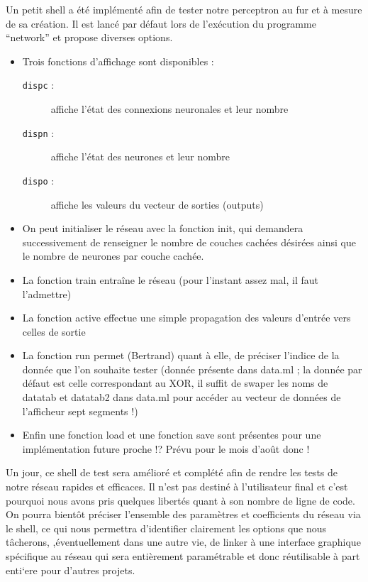 Un petit shell a \'et\'e impl\'ement\'e afin de tester notre perceptron
au fur et \`a mesure de sa cr\'eation. Il est lanc\'e par d\'efaut lors
de l'ex\'ecution du programme ``network'' et propose diverses
options. 
\begin{itemize}
	\item Trois fonctions d'affichage sont disponibles : 
\begin{description}
	\item[\verb!dispc! :] affiche l'\'etat des connexions neuronales et leur nombre
	\item[\verb!dispn! :] affiche l'\'etat des neurones et leur nombre
	\item[\verb!dispo! :] affiche les valeurs du vecteur de sorties (outputs)
\end{description}

\item On peut initialiser le r\'eseau avec la fonction init, qui demandera
successivement de renseigner le nombre de couches cach\'ees d\'esir\'ees
ainsi que le nombre de neurones par couche cach\'ee.

\item La fonction train entra\^ine le r\'eseau (pour l'instant assez mal, il
faut l'admettre) 

\item La fonction active effectue une simple propagation des valeurs
d'entr\'ee vers celles de sortie

\item La fonction run permet (Bertrand) quant \`a elle, de pr\'eciser l'indice de la donn\'ee
que l'on souhaite tester (donn\'ee pr\'esente dans data.ml ; la donn\'ee
par d\'efaut est celle correspondant au XOR, il suffit de swaper les
noms de datatab et datatab2 dans data.ml pour acc\'eder au vecteur de
donn\'ees de l'afficheur sept segments !)

\item Enfin une fonction load et une fonction save sont pr\'esentes pour une
impl\'ementation future proche !? Prévu pour le mois d'août donc !

\end{itemize}


Un jour, ce shell de test sera am\'elior\'e et compl\'et\'e afin de rendre les
tests de notre r\'eseau rapides et efficaces. Il n'est pas destin\'e \`a
l'utilisateur final et c'est pourquoi nous avons pris quelques
libert\'es quant \`a son nombre de ligne de code.
On pourra bient\^ot pr\'eciser l'ensemble des param\`etres et
coefficients du r\'eseau via le shell, ce qui nous permettra
d'identifier clairement les options que nous t\^acherons,
,\'eventuellement dans une autre vie, de linker \`a une interface graphique
sp\'ecifique au r\'eseau qui sera enti\`erement param\'etrable et donc
r\'eutilisable \`a part enti`ere pour d'autres projets.

